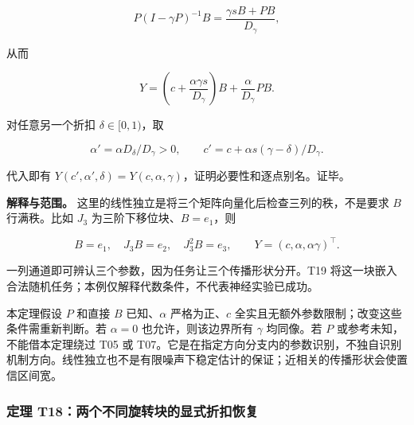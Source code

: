 \documentclass[11pt,a4paper]{article}
\begin{document}
\[
P(I-\gamma P)^{-1}B
=\frac{\gamma s B+PB}{D_\gamma},
\]

\par
\noindent\begin{minipage}{\linewidth}

从而

\[
Y=\left(c+\frac{\alpha\gamma s}{D_\gamma}\right)B
+\frac{\alpha}{D_\gamma}PB.
\]

\end{minipage}\par

\par
\noindent\begin{minipage}{\linewidth}

对任意另一个折扣 \(\delta\in[0,1)\)，取

\[
\alpha'=\alpha D_\delta/D_\gamma>0,
\qquad
c'=c+\alpha s(\gamma-\delta)/D_\gamma.
\]

\end{minipage}\par

代入即有
\(Y(c',\alpha',\delta)=Y(c,\alpha,\gamma)\)，证明必要性和逐点别名。证毕。

\par
\noindent\begin{minipage}{\linewidth}

\textbf{解释与范围。}
这里的线性独立是将三个矩阵向量化后检查三列的秩，不是要求 \(B\)
行满秩。比如 \(J_3\) 为三阶下移位块、\(B=e_1\)，则

\[
B=e_1,\quad J_3B=e_2,\quad J_3^2B=e_3,\qquad
Y=(c,\alpha,\alpha\gamma)^\top.
\]

\end{minipage}\par

一列通道即可辨认三个参数，因为任务让三个传播形状分开。T19
将这一块嵌入合法随机任务；本例仅解释代数条件，不代表神经实验已成功。

本定理假设 \(P\) 和直接 \(B\) 已知、\(\alpha\) 严格为正、\(c\)
全实且无额外参数限制；改变这些条件需重新判断。若 \(\alpha=0\)
也允许，则该边界所有 \(\gamma\) 均同像。若 \(P\)
或参考未知，不能借本定理绕过 T05 或
T07。它是在指定方向分支内的参数识别，不独自识别机制方向。线性独立也不是有限噪声下稳定估计的保证；近相关的传播形状会使置信区间宽。

\subsubsection{定理
T18：两个不同旋转块的显式折扣恢复}\label{ux5b9aux7406-t18ux4e24ux4e2aux4e0dux540cux65cbux8f6cux5757ux7684ux663eux5f0fux6298ux6263ux6062ux590d}
\end{document}
